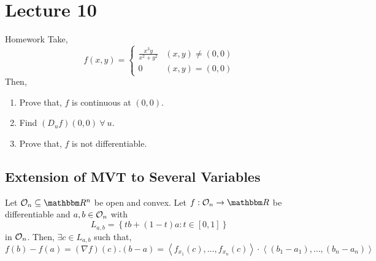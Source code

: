 \documentclass[Analysis-3]{subfiles}
\begin{document}
\chapter*{Lecture 10} %
\setcounter{chapter}{10} %


\begin{Eg}{Homework}{}
    Take, \[ f(x,y) = \begin{cases}
            \frac{x^{3}y}{x^2 + y^2} & (x,y) \neq (0,0) \\
            0                        & (x,y) = (0,0)
        \end{cases}\]
    Then,
    \begin{enumerate}
        \item Prove that, $f$ is continuous at $(0,0)$.
        \item Find $(D_{u}f)(0,0)\ \forall\ u$.
        \item Prove that, $f$ is not differentiable.
    \end{enumerate}
\end{Eg}

\section{Extension of MVT to Several Variables}

\begin{Thm}{}{}
    Let $ \Op{n} \subseteq \R^n $ be open and convex. Let $f : \Op{n} \to \R$ be differentiable and $a,b \in \mathcal{O}_{n}$ with \[L_{a,b} = \left\{ tb + (1-t)a : t \in [0,1]\right\} \] in $\mathcal{O}_{n}$. Then, $\exists c \in L_{a,b}$ such that, \[ f(b) - f(a) = (\nabla f)(c) . (b-a) = \left\langle f_{x_1}(c), \ldots, f_{x_n}(c) \right\rangle\cdot\left\langle (b_1 - a_1), \ldots, (b_n - a_n) \right\rangle  \]
\end{Thm}
\end{document}
